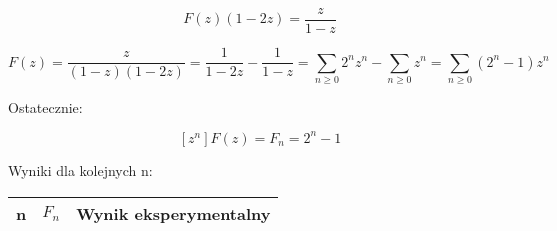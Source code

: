 \documentclass{article}
\begin{document}
    $$F(z)(1 - 2z) = \frac{z}{1 - z}$$

    $$F(z) = \frac{z}{(1 - z)(1 - 2z)} = \frac{1}{1 - 2z} - \frac{1}{1 - z} = \sum_{n \geq 0} 2^{n} z^{n} - \sum_{n \geq 0} z^{n} = 
        \sum_{n \geq 0} (2^{n} - 1) z^{n}$$

    Ostatecznie:

    $$[z^{n}] F(z) = F_{n} = 2^{n} - 1$$

    Wyniki dla kolejnych n:

    \begin{table}[H]
        \begin{center}
            \begin{tabular}{c||c|c}
                \textbf{n} & \textbf{\textbf{$F_n$}} & \textbf{Wynik eksperymentalny} \\
                \hline


\end{tabular}
\end{center}
\end{table}
\end{document}
